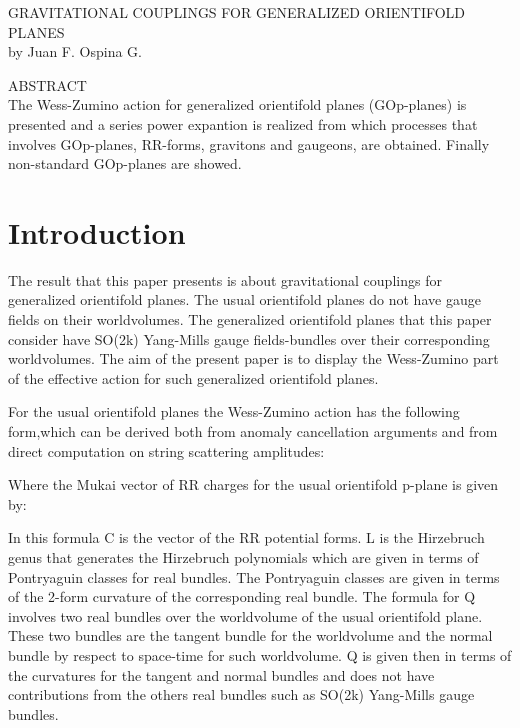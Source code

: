 \documentclass[a4paper,a4paper]{article}
\begin{document}
\begin{center}
GRAVITATIONAL COUPLINGS FOR GENERALIZED ORIENTIFOLD PLANES \\ [.25in]
by Juan F. Ospina G.
\end{center}
\begin{center}
ABSTRACT \\ [.25in]
The Wess-Zumino action for generalized orientifold planes (GOp-planes) is presented and a series power expantion is realized from which processes that involves GOp-planes, RR-forms, gravitons and gaugeons, are obtained. Finally non-standard GOp-planes are showed.
\end{center}

\section{Introduction}
The result that this paper presents is about gravitational couplings for generalized orientifold planes. The usual orientifold planes do not have gauge fields on their worldvolumes. The generalized orientifold planes that this paper consider have SO(2k) Yang-Mills gauge fields-bundles over their corresponding worldvolumes. The aim of the present paper is to display the Wess-Zumino part of the effective action for such generalized orientifold planes.

For the usual orientifold planes the Wess-Zumino action has the following form,which can be derived both from anomaly cancellation arguments and from
direct computation on string scattering amplitudes:   

\begin{center}
{  \coordHE{} }
\end{center}

Where the Mukai vector of RR charges for the usual orientifold p-plane is given by:

\begin{center}
{  \coordHE{} }
\end{center}
In this formula C is the vector of the RR potential forms. L is the Hirzebruch genus that generates the Hirzebruch polynomials which are given in
terms of Pontryaguin classes for real bundles. The Pontryaguin classes are given in terms of the 2-form curvature of the corresponding real bundle. The
formula for Q involves two real bundles over the worldvolume of the usual orientifold plane.  These two bundles are the tangent bundle for the worldvolume and the normal bundle by respect to space-time for such worldvolume. Q is given then in terms of the curvatures for the tangent and
normal bundles and does not have contributions  from the others real bundles
such as SO(2k) Yang-Mills gauge bundles.
\end{document}
